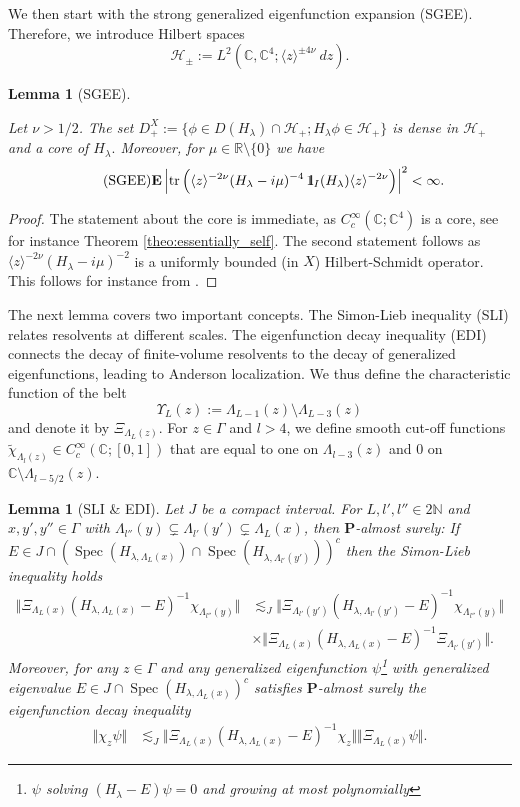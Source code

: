 \documentclass[reqno,12pt,letterpaper]{amsart}
\newcommand{\CC}{{\mathbb C}}
\newtheorem{lemm}[theo]{Lemma}
\numberwithin{equation}{section}
\DeclareMathOperator{\Spec}{Spec}
\DeclareMathOperator{\tr}{tr}
\def\indic{\operatorname{1\hskip-2.75pt\relax l}}
\begin{document}
We then start with the strong generalized eigenfunction expansion (SGEE). Therefore, we introduce Hilbert spaces
\[ \mathcal H_{\pm} := L^2(\CC, \CC^4;  \langle z \rangle^{\pm 4 \nu} \ dz).\]
\begin{lemm}[SGEE]
\label{lemm:SGEE}

Let $\nu > 1/2$. The set $D^{X}_+:=\{\phi \in D(H_{\lambda}) \cap \mathcal H_+; H_{\lambda}\phi \in \mathcal H_+\}$ is dense in $\mathcal H_+$ and a core of $H_{\lambda}.$
Moreover, for $\mu \in \mathbb R \setminus \{0\}$ we have \[
\tag{SGEE} \mathbf E\left\lvert \tr\Big(\langle z \rangle^{-2\nu}(H_{\lambda}-i\mu)^{-4}\indic_I(H_{\lambda}) \langle z \rangle^{-2\nu} \Big) \right\rvert^2 <\infty.\]
\end{lemm} 
\begin{proof}
The statement about the core is immediate, as $C_c^{\infty}(\CC;\CC^4)$ is a core, see for instance Theorem \ref{theo:essentially_self}. The second statement follows as $\langle z \rangle^{-2\nu}(H_{\lambda}-i\mu)^{-2}$ is a uniformly bounded (in $X$) Hilbert-Schmidt operator. This follows for instance from \cite[Prop.9.2]{DS10}.
\end{proof}
The next lemma covers two important concepts. The Simon-Lieb inequality (SLI) relates resolvents at different scales. The eigenfunction decay inequality (EDI) connects the decay of finite-volume resolvents to the decay of generalized eigenfunctions, leading to Anderson localization. We thus define the characteristic function of the belt 
\[ \Upsilon_L(z):=\Lambda_{L-1}(z) \setminus \Lambda_{L-3}(z)\]
and denote it by $\Xi_{\Lambda_L(z)}.$ 
For $z \in \Gamma$ and $l>4$, we define smooth cut-off functions $\tilde \chi_{\Lambda_l(z)} \in C_c^{\infty}(\CC; [0,1])$ that are equal to one on $\Lambda_{l-3}(z)$ and $0$ on $\CC \setminus \Lambda_{l-5/2}(z).$
\begin{lemm}[SLI \& EDI]
\label{lemm:SLIEDI}
Let $J$ be a compact interval. For $L, l',l'' \in 2\mathbb N$ and $x,y',y'' \in \Gamma$ with $\Lambda_{l''}(y) \subsetneq \Lambda_{l'}(y') \subsetneq \Lambda_L(x)$, then $\mathbf P$-almost surely: If $E \in J \cap (\Spec(H_{\lambda,\Lambda_L(x)}) \cap \Spec(H_{\lambda, \Lambda_{l'}(y')}))^c$ then the Simon-Lieb inequality holds
\[\tag{SLI} \begin{split} \Vert \Xi_{\Lambda_L(x)}(H_{\lambda,\Lambda_L(x)}-E)^{-1} \chi_{\Lambda_{l''}(y)}\Vert &\lesssim_J \Vert \Xi_{\Lambda_{l'}(y')}(H_{\lambda,\Lambda_{l'}(y')}-E)^{-1} \chi_{\Lambda_{l''}(y)} \Vert \\
&\times \Vert \Xi_{\Lambda_L(x)} (H_{\lambda,\Lambda_L(x)}-E)^{-1} \Xi_{\Lambda_{l'}(y')}\Vert.\end{split}\]
Moreover, for any $z \in \Gamma$ and any generalized eigenfunction $\psi$\footnote{ $\psi$ solving $(H_{\lambda}-E)\psi=0$ and growing at most polynomially} with generalized eigenvalue $E \in J \cap \Spec(H_{\lambda,\Lambda_L(x)})^c$ satisfies $\mathbf P$-almost surely the eigenfunction decay inequality
 \[\tag{EDI}
\begin{split} \Vert \chi_z \psi \Vert &\lesssim_J \Vert \Xi_{\Lambda_L(x)} (H_{\lambda,\Lambda_L(x)}-E)^{-1}\chi_z \Vert \Vert \Xi_{\Lambda_L(x)} \psi \Vert.
\end{split}\]
\end{lemm}
\end{document}
